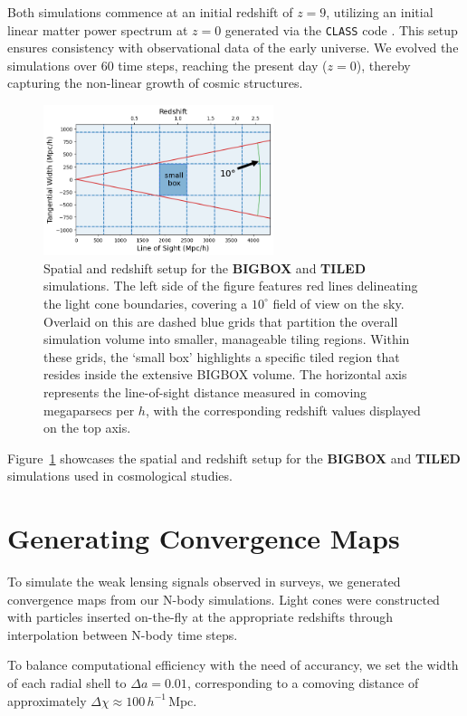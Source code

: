 Both simulations commence at an initial redshift of $z = 9$, utilizing an initial linear matter power spectrum at $z = 0$ generated via the \texttt{CLASS} code \citep{2011JCAP...07..034B}. This setup ensures consistency with observational data of the early universe. We evolved the simulations over 60 time steps, reaching the present day ($z = 0$), thereby capturing the non-linear growth of cosmic structures.

\begin{figure}[ht]
    \centering
    \includegraphics[width=0.6\textwidth]{figures/light_cone_configuration.png}
    \caption{Spatial and redshift setup for the \textbf{BIGBOX} and \textbf{TILED} simulations. The left side of the figure features red lines delineating the light cone boundaries, covering a $10^\circ$ field of view on the sky. Overlaid on this are dashed blue grids that partition the overall simulation volume into smaller, manageable tiling regions. Within these grids, the `small box' highlights a specific tiled region that resides inside the extensive BIGBOX volume. The horizontal axis represents the line-of-sight distance measured in comoving megaparsecs per $h$, with the corresponding redshift values displayed on the top axis.} \label{fig:simulationsetting}
\end{figure}
Figure~\ref{fig:simulationsetting} showcases the spatial and redshift setup for the \textbf{BIGBOX} and \textbf{TILED} simulations used in cosmological studies. 

\section{Generating Convergence Maps}
To simulate the weak lensing signals observed in surveys, we generated convergence maps from our N-body simulations. Light cones were constructed with particles inserted on-the-fly at the appropriate redshifts through interpolation between N-body time steps.

To balance computational efficiency with the need of accurancy, we set the width of each radial shell to $\Delta a = 0.01$, corresponding to a comoving distance of approximately $\Delta \chi \approx 100 \, h^{-1} \, \text{Mpc}$.

